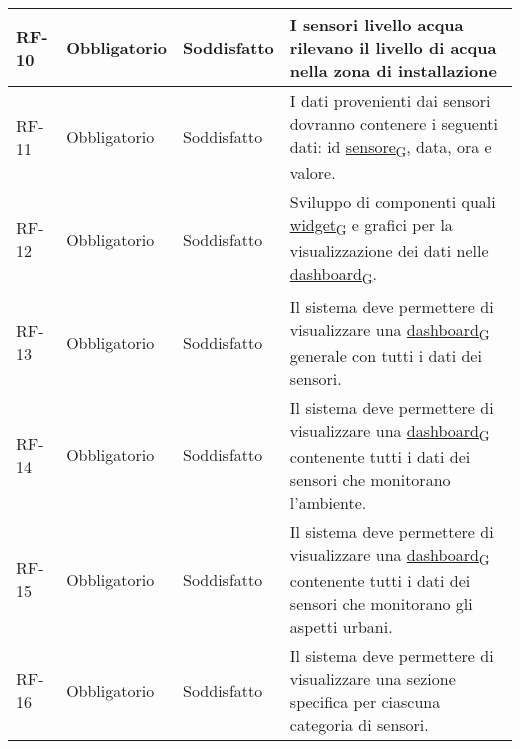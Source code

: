 \begin{longtable}{|>{\centering\arraybackslash}m{}|>{\centering\arraybackslash}m{}|>{\centering\arraybackslash}m{}|>{\centering\arraybackslash}m{}|}
	\\\hline
	RF-10           & Obbligatorio        & Soddisfatto & I sensori livello acqua rilevano il livello di acqua nella zona di installazione
	\\\hline
	RF-11           & Obbligatorio        & Soddisfatto & I dati provenienti dai sensori dovranno contenere i seguenti dati: id \href{https://7last.github.io/docs/pb/documentazione-interna/glossario\#sensore}{sensore\textsubscript{G}}, data, ora e valore.
	\\\hline
	RF-12           & Obbligatorio        & Soddisfatto & Sviluppo di componenti quali \href{https://7last.github.io/docs/pb/documentazione-interna/glossario\#widget}{widget\textsubscript{G}} e grafici per la visualizzazione dei dati nelle \href{https://7last.github.io/docs/pb/documentazione-interna/glossario\#dashboard}{dashboard\textsubscript{G}}.
	\\\hline
	RF-13           & Obbligatorio        & Soddisfatto                                                                                                          & Il sistema deve permettere di visualizzare una \href{https://7last.github.io/docs/pb/documentazione-interna/glossario\#dashboard}{dashboard\textsubscript{G}} generale con tutti i dati dei sensori.
	\\\hline
	RF-14           & Obbligatorio        & Soddisfatto                                                                                                           & Il sistema deve permettere di visualizzare una \href{https://7last.github.io/docs/pb/documentazione-interna/glossario\#dashboard}{dashboard\textsubscript{G}} contenente tutti i dati dei sensori che monitorano l'ambiente.
	\\\hline
	RF-15           & Obbligatorio        & Soddisfatto                                                                                                           & Il sistema deve permettere di visualizzare una \href{https://7last.github.io/docs/pb/documentazione-interna/glossario\#dashboard}{dashboard\textsubscript{G}} contenente tutti i dati dei sensori che monitorano gli aspetti urbani.
	\\\hline
	RF-16           & Obbligatorio        & Soddisfatto                                                                                                           & Il sistema deve permettere di visualizzare una sezione specifica per ciascuna categoria di sensori.
	\\\hline

\end{longtable}
